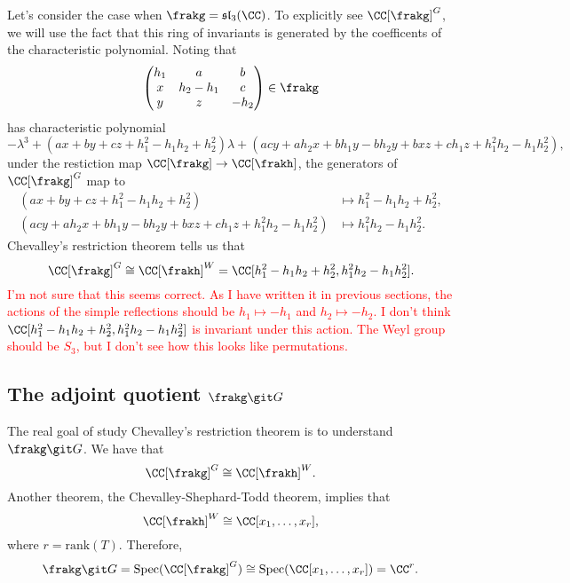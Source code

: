 \begin{example}
Let's consider the case when $\frakg = \mathfrak{sl}_3(\CC)$.
To explicitly see $\CC[\frakg]^G$, we will use the fact that this ring of invariants is generated by the coefficents of the characteristic polynomial.
Noting that
$$
\begin{pmatrix}
	h_1 & a & b \\
	x & h_2 - h_1 & c \\
	y & z & - h_2
\end{pmatrix} \in \frakg$$
has characteristic polynomial
$$- \lambda^3 + (ax + by + cz + h_1^2 - h_1 h_2 + h_2^2) \lambda 
+( acy + ah_2x + bh_1y - bh_2y + bxz + ch_1z + h_1^2h_2 - h_1h_2^2),$$
under the restiction map $\CC[\frakg] \to \CC[\frakh]$, the generators of $\CC[\frakg]^G$ map to 
\begin{align*}
	(ax + by + cz + h_1^2 - h_1 h_2 + h_2^2) &\mapsto h_1^2 - h_1 h_2 + h_2^2, \\
	(acy + ah_2x + bh_1y - bh_2y + bxz + ch_1z + h_1^2h_2 - h_1h_2^2) &\mapsto h_1^2 h_2 - h_1 h_2^2.
\end{align*}
Chevalley's restriction theorem tells us that
$$\CC[\frakg]^G \cong \CC[\frakh]^W = \CC[h_1^2 - h_1 h_2 + h_2^2, h_1^2 h_2 - h_1 h_2^2].$$
\textcolor{red}{
I'm not sure that this seems correct.
As I have written it in previous sections, the actions of the simple reflections should be $h_1 \mapsto - h_1$ and $h_2 \mapsto - h_2$.
I don't think $\CC[h_1^2 - h_1 h_2 + h_2^2, h_1^2 h_2 - h_1 h_2^2]$ is invariant under this action.
The Weyl group should be $S_3$, but I don't see how this looks like permutations.
}
\end{example}

\subsection{The adjoint quotient $\frakg\git G$}
The real goal of study Chevalley's restriction theorem is to understand $\frakg \git G$.
We have that 
$$\CC[\frakg]^G \cong \CC[\frakh]^W.$$
Another theorem, the Chevalley-Shephard-Todd theorem, implies that
$$\CC[\frakh]^W \cong \CC[x_1, \ldots, x_r],$$
where $r = \mathrm{rank}(T)$.
Therefore, 
$$\frakg \git G = \mathrm{Spec}(\CC[\frakg]^G) \cong \mathrm{Spec}(\CC[x_1, \ldots, x_r]) = \CC^r.$$

